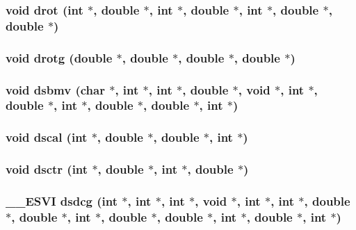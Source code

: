 \subsubsection{\setlength{\rightskip}{0pt plus 5cm}void drot (int $\ast$, double $\ast$, int $\ast$, double $\ast$, int $\ast$, double $\ast$, double $\ast$)}\label{essl_8h_67780c50b58ab9ddb3486e916a67da46}


\subsubsection{\setlength{\rightskip}{0pt plus 5cm}void drotg (double $\ast$, double $\ast$, double $\ast$, double $\ast$)}\label{essl_8h_53729fe81bf6531bba923ba5c833414d}


\subsubsection{\setlength{\rightskip}{0pt plus 5cm}void dsbmv (char $\ast$, int $\ast$, int $\ast$, double $\ast$, void $\ast$, int $\ast$, double $\ast$, int $\ast$, double $\ast$, double $\ast$, int $\ast$)}\label{essl_8h_1d17d941e059df839d40f54083688294}


\subsubsection{\setlength{\rightskip}{0pt plus 5cm}void dscal (int $\ast$, double $\ast$, double $\ast$, int $\ast$)}\label{essl_8h_e4d6e3fda89033cd957e382c5270c076}


\subsubsection{\setlength{\rightskip}{0pt plus 5cm}void dsctr (int $\ast$, double $\ast$, int $\ast$, double $\ast$)}\label{essl_8h_ce316a9d5a55ad813b784c4e0e62332c}


\subsubsection{\setlength{\rightskip}{0pt plus 5cm}\_\-\_\-ESVI dsdcg (int $\ast$, int $\ast$, int $\ast$, void $\ast$, int $\ast$, int $\ast$, double $\ast$, double $\ast$, int $\ast$, double $\ast$, double $\ast$, int $\ast$, double $\ast$, int $\ast$)}\label{essl_8h_a606b6c1a48c458c96fc31f41c599130}


